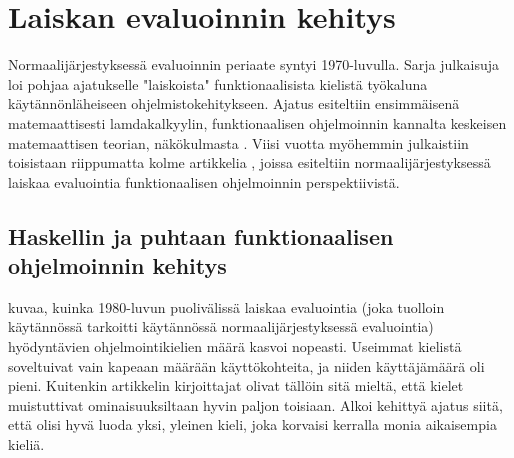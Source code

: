 
\section{Laiskan evaluoinnin kehitys \label{historia}}


Normaalijärjestyksessä evaluoinnin periaate syntyi 1970-luvulla. Sarja julkaisuja loi pohjaa ajatukselle "laiskoista" funktionaalisista kielistä työkaluna käytännönläheiseen ohjelmistokehitykseen. Ajatus esiteltiin ensimmäisenä matemaattisesti lamdakalkyylin, funktionaalisen ohjelmoinnin kannalta keskeisen matemaattisen teorian, näkökulmasta \citep{wadsworth1971semantics}. Viisi vuotta myöhemmin julkaistiin toisistaan riippumatta kolme artikkelia \citep{henderson1976lazy,friedman1976cuns,saslmanualturner}, joissa esiteltiin normaalijärjestyksessä laiskaa evaluointia  funktionaalisen ohjelmoinnin perspektiivistä.

\subsection{Haskellin ja puhtaan funktionaalisen ohjelmoinnin kehitys}

\citet{hudak2007history} kuvaa, kuinka 1980-luvun puolivälissä laiskaa evaluointia (joka tuolloin käytännössä tarkoitti käytännössä normaalijärjestyksessä evaluointia) hyödyntävien ohjelmointikielien määrä kasvoi nopeasti. Useimmat kielistä soveltuivat vain kapeaan määrään käyttökohteita, ja niiden käyttäjämäärä oli pieni. Kuitenkin artikkelin kirjoittajat olivat tällöin sitä mieltä, että kielet muistuttivat ominaisuuksiltaan hyvin paljon toisiaan. Alkoi kehittyä ajatus siitä, että olisi hyvä luoda yksi, yleinen kieli, joka korvaisi kerralla monia aikaisempia kieliä.

